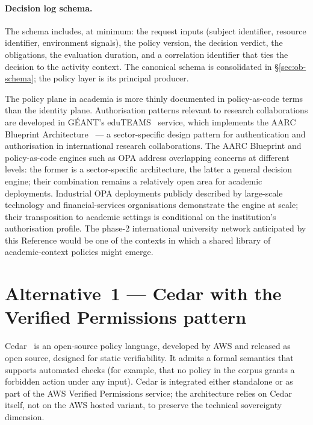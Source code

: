 \paragraph{Decision log schema.} The schema includes, at minimum:
the request inputs (subject identifier, resource identifier,
environment signals), the policy version, the decision verdict, the
obligations, the evaluation duration, and a correlation identifier
that ties the decision to the activity context. The canonical schema
is consolidated in  \S\ref{sec:ob-schema};
the policy layer is its principal producer.

\begin{realworldbox}
\noindent The policy plane in academia is more thinly documented
in policy-as-code terms than the identity plane. Authorisation
patterns relevant to research collaborations are developed in
GÉANT's eduTEAMS~\cite{eduteams} service, which implements the
AARC Blueprint Architecture~\cite{aarc-blueprint} --- a
sector-specific design pattern for
authentication and authorisation in international research
collaborations. The AARC Blueprint and policy-as-code engines
such as OPA address overlapping concerns at different levels:
the former is a sector-specific architecture, the latter a
general decision engine; their combination remains a relatively
open area for academic deployments. Industrial OPA deployments
publicly described by large-scale technology and financial-services
organisations demonstrate the engine at scale; their
transposition to academic settings is conditional on the
institution's authorisation profile. The phase-2 international
university network anticipated by this Reference would be one of
the contexts in which a shared library of academic-context
policies might emerge.
\end{realworldbox}

\section{Alternative~1 --- Cedar with the Verified Permissions pattern}
\label{sec:po-alt1}

\begin{alternativebox}
\noindent Cedar~\cite{cedar-project} is an open-source policy language,
developed by AWS and released as open source, designed for static
verifiability. It
admits a formal semantics that supports automated checks (for
example, that no policy in the corpus grants a forbidden action under
any input). Cedar is integrated either standalone or as part of the
AWS Verified Permissions service; the architecture relies on Cedar
itself, not on the AWS hosted variant, to preserve the technical
sovereignty dimension.
\end{alternativebox}

